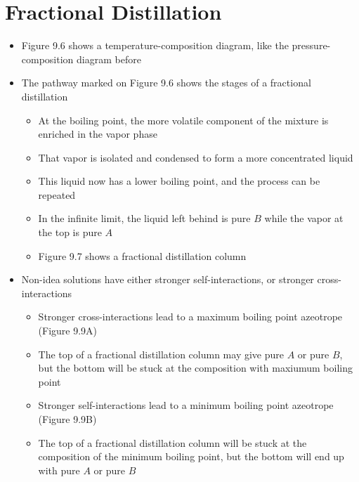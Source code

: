 \documentclass[12pt, openany, letterpaper]{memoir}
\begin{document}
\section*{Fractional Distillation}
\begin{itemize}
	\item Figure 9.6 shows a temperature-composition diagram, like the pressure-composition diagram before
	\item The pathway marked on Figure 9.6 shows the stages of a fractional distillation
	\begin{itemize}
		\item At the boiling point, the more volatile component of the mixture is enriched in the vapor phase
		\item That vapor is isolated and condensed to form a more concentrated liquid
		\item This liquid now has a lower boiling point, and the process can be repeated
		\item In the infinite limit, the liquid left behind is pure $B$ while the vapor at the top is pure $A$
		\item Figure 9.7 shows a fractional distillation column
	\end{itemize}
	\item Non-idea solutions have either stronger self-interactions, or stronger cross-interactions
	\begin{itemize}
		\item Stronger cross-interactions lead to a maximum boiling point azeotrope (Figure 9.9A)
		\item The top of a fractional distillation column may give pure $A$ or pure $B$, but the bottom will be stuck at the composition with maxiumum boiling point
		\item Stronger self-interactions lead to a minimum boiling point azeotrope (Figure 9.9B)
		\item The top of a fractional distillation column will be stuck at the composition of the minimum boiling point, but the bottom will end up with pure $A$ or pure $B$
	\end{itemize}
\end{itemize}
\end{document}
